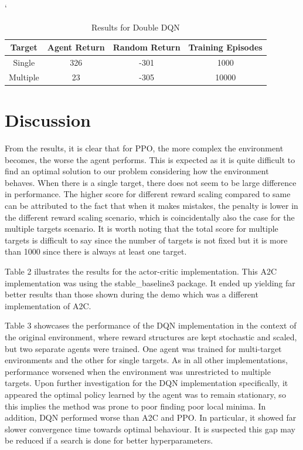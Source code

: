 \documentclass{article}
\begin{document}
`   \begin{table}[h]
        \centering
        \caption[]{Results for Double DQN}\label{Results for PPO}%
        \begin{tabular}{cccc}
            \toprule
            Target & Agent Return & Random Return & Training Episodes \\
            \midrule
            Single & 326 & -301 & 1000 \\
            Multiple & 23 & -305 & 10000 \\
            \bottomrule
        \end{tabular}
        \label{tab: PPO_Table}
    \end{table}
    
    \section{Discussion}
    \label{discussion}
    From the results, it is clear that for PPO, the more complex the environment becomes, the worse the agent performs. This is expected as it is quite difficult to find an optimal solution to our problem considering how the environment behaves. When there is a single target, there does not seem to be large difference in performance. The higher score for different reward scaling compared to same can be attributed to the fact that when it makes mistakes, the penalty is lower in the different reward scaling scenario, which is coincidentally also the case for the multiple targets scenario. It is worth noting that the total score for multiple targets is difficult to say since the number of targets is not fixed but it is more than 1000 since there is always at least one target.

    Table 2 illustrates the results for the actor-critic implementation. This A2C implementation was using the stable\_baseline3 package. It ended up yielding far better results than those shown during the demo which was a different implementation of A2C.

    Table 3 showcases the performance of the DQN implementation in the context of the original environment, where reward structures are kept stochastic and scaled, but two separate agents were trained. One agent was trained for multi-target environments and the other for single targets. As in all other implementations, performance worsened when the environment was unrestricted to multiple targets. Upon further investigation for the DQN implementation specifically, it appeared the optimal policy learned by the agent was to remain stationary, so this implies the method was prone to poor finding poor local minima. In addition, DQN performed worse than A2C and PPO. In particular, it showed far slower convergence time towards optimal behaviour. It is suspected this gap may be reduced if a search is done for better hyperparameters.
    
\end{document}
